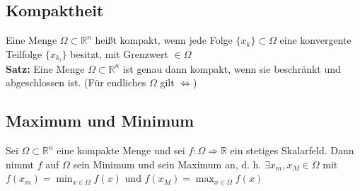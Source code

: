 \documentclass[german]{latex4ei/latex4ei_sheet}
\begin{document}
\begin{sectionbox}	
	\subsection{Kompaktheit}
	Eine Menge $\Omega \subset \mathbb{R}^n$ hei\ss{}t kompakt, wenn jede Folge $\{x_k\} \subset \Omega$ eine konvergente Teilfolge $\{x_{k_l}\}$ besitzt, mit Grenzwert $\in \Omega$\\
	\textbf{Satz:} Eine Menge $\Omega \subset \mathbb{R}^n$ ist genau dann kompakt, wenn sie beschr\"ankt und abgeschlossen ist. (F\"ur endliches $\Omega$ gilt $\Leftrightarrow$)
	
	\subsection{Maximum und Minimum}
	Sei $\Omega \subset \mathbb{R}^n$ eine kompakte Menge und sei $f: \Omega \Rightarrow \mathbb{R}$ ein stetiges Skalarfeld. Dann nimmt $f$ auf $\Omega$ sein Minimum und sein Maximum an, d. h. $\exists x_m, x_M \in \Omega$ mit $f(x_m)=\min_{x \in \Omega} f(x)$ und $f(x_M)=\max_{x \in \Omega} f(x)$
\end{sectionbox}
\end{document}
